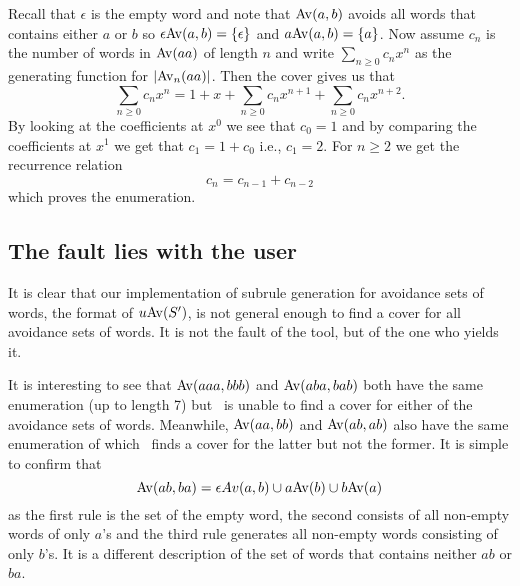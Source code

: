 Recall that $\epsilon$ is the empty word and note that ${\mathrm{Av}\!\left(a,b\right)}$ avoids all 
words that contains either $a$ or $b$ so $\epsilon {\mathrm{Av}\!\left(a,b\right)} = \{ \epsilon \}$ 
and $a {\mathrm{Av}\!\left(a,b\right)} = \{ a \}$. Now assume $c_n$ is the number of words in ${\mathrm{Av}\!\left(aa\right)}$ 
of length $n$ and write $\sum_{n \geq 0} c_n x^n$ as the generating function for 
$\left| {\mathrm{Av}_n\!\left(aa\right)} \right|$. Then the cover gives us that \[\sum_{n \geq 0} c_n 
x^n = 1 + x + \sum_{n \geq 0} c_n x^{n+1} + \sum_{n \geq 0} c_n x^{n+2} .\] By 
looking at the coefficients at $x^0$ we see that $c_0 = 1$ and by comparing the 
coefficients at $x^1$ we get that $c_1 = 1 + c_0$ i.e., $c_1 = 2$. For $n \geq 
2$ we get the recurrence relation \[ c_{n} = c_{n-1} + c_{n-2} \] which proves 
the enumeration.


\subsection{The fault lies with the user}

It is clear that our implementation of subrule generation for avoidance sets of 
words, the format of $u {\mathrm{Av}\!\left(S'\right)}$, is not general enough to find a cover for all 
avoidance sets of words. It is not the fault of the tool, but of the one who 
yields it.

It is interesting to see that ${\mathrm{Av}\!\left(aaa, bbb\right)}$ and ${\mathrm{Av}\!\left(aba, bab\right)}$ both have the 
same enumeration (up to length 7) but \CombCov\ is unable to find a cover for 
either of the avoidance sets of words. Meanwhile, ${\mathrm{Av}\!\left(aa, bb\right)}$ and 
${\mathrm{Av}\!\left(ab, ab\right)}$ also have the same enumeration of which \CombCov\ finds a cover 
for the latter but not the former. It is simple to confirm that \[{\mathrm{Av}\!\left(ab, ba\right)} = 
\epsilon Av(a,b)\cup a {\mathrm{Av}\!\left(b\right)} \cup b {\mathrm{Av}\!\left(a\right)}\] as the first rule is the set of 
the empty word, the second consists of all non-empty words of only $a$'s and the 
third rule generates all non-empty words consisting of only $b$'s. It is a 
different description of the set of words that contains neither $ab$ or $ba$.
